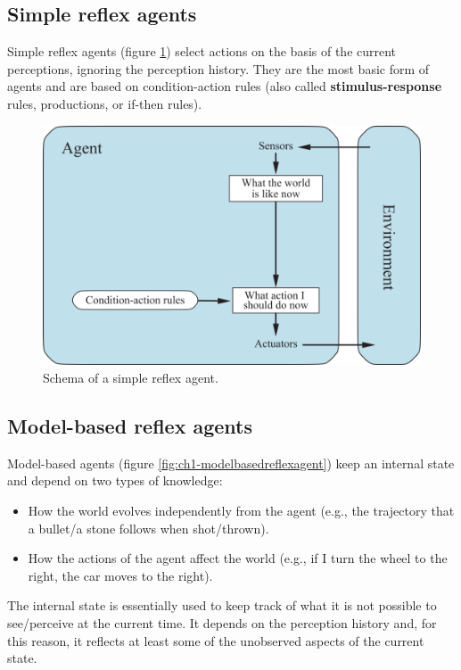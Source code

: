 \subsection{Simple reflex agents}
Simple reflex agents (figure \ref{fig:ch1-simplereflexagent}) select actions on the basis of the current perceptions, ignoring the perception history. They are the most basic form of agents and are based on condition-action rules (also called \textbf{stimulus-response} rules, productions, or if-then rules).

\begin{figure}[hbt]
    \centering
    \includegraphics{Images/Chapter 1/simple-reflex-agents.png}
    \caption{Schema of a simple reflex agent.}
    \label{fig:ch1-simplereflexagent}
\end{figure}

\subsection{Model-based reflex agents}
Model-based agents (figure \ref{fig:ch1-modelbasedreflexagent}) keep an internal state and depend on two types of knowledge:

\begin{itemize}
    \item How the world evolves independently from the agent (e.g., the trajectory that a bullet/a stone follows when shot/thrown).
    \item How the actions of the agent affect the world (e.g., if I turn the wheel to the right, the car moves to the right).
\end{itemize}

The internal state is essentially used to keep track of what it is not possible to see/perceive at the current time. It depends on the perception history and, for this reason, it reflects at least some of the unobserved aspects of the current state.

